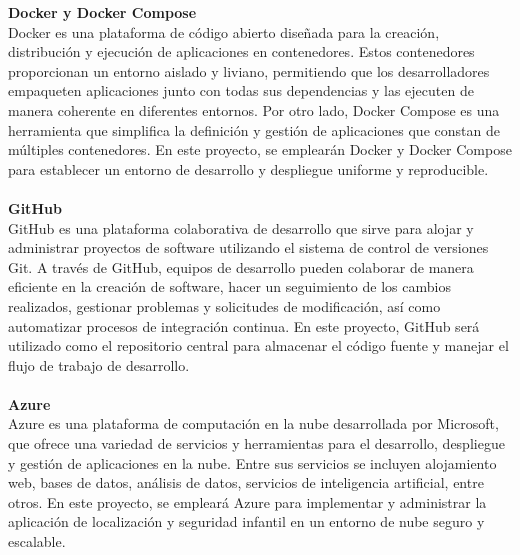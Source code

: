 \documentclass[12pt,onehalfspacing]{report}
\begin{document}
\textbf{Docker y Docker Compose}\\
Docker es una plataforma de código abierto diseñada para la creación, distribución y ejecución de aplicaciones en contenedores. Estos contenedores proporcionan un entorno aislado y liviano, permitiendo que los desarrolladores empaqueten aplicaciones junto con todas sus dependencias y las ejecuten de manera coherente en diferentes entornos. Por otro lado, Docker Compose es una herramienta que simplifica la definición y gestión de aplicaciones que constan de múltiples contenedores. En este proyecto, se emplearán Docker y Docker Compose para establecer un entorno de desarrollo y despliegue uniforme y reproducible.\\\\
\textbf{GitHub}\\
GitHub es una plataforma colaborativa de desarrollo que sirve para alojar y administrar proyectos de software utilizando el sistema de control de versiones Git. A través de GitHub, equipos de desarrollo pueden colaborar de manera eficiente en la creación de software, hacer un seguimiento de los cambios realizados, gestionar problemas y solicitudes de modificación, así como automatizar procesos de integración continua. En este proyecto, GitHub será utilizado como el repositorio central para almacenar el código fuente y manejar el flujo de trabajo de desarrollo.\\\\
\textbf{Azure}\\
Azure es una plataforma de computación en la nube desarrollada por Microsoft, que ofrece una variedad de servicios y herramientas para el desarrollo, despliegue y gestión de aplicaciones en la nube. Entre sus servicios se incluyen alojamiento web, bases de datos, análisis de datos, servicios de inteligencia artificial, entre otros. En este proyecto, se empleará Azure para implementar y administrar la aplicación de localización y seguridad infantil en un entorno de nube seguro y escalable.
\end{document}
